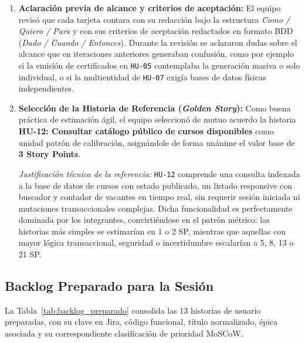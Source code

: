 \begin{enumerate}
    \item \textbf{Aclaración previa de alcance y criterios de aceptación:} El equipo revisó que cada tarjeta contara con su redacción bajo la estructura \textit{Como / Quiero / Para} y con sus criterios de aceptación redactados en formato BDD (\textit{Dado / Cuando / Entonces}). Durante la revisión se aclararon dudas sobre el alcance que en iteraciones anteriores generaban confusión, como por ejemplo si la emisión de certificados en \texttt{HU-05} contemplaba la generación masiva o solo individual, o si la multientidad de \texttt{HU-07} exigía bases de datos físicas independientes.
    
    \item \textbf{Selección de la Historia de Referencia (\textit{Golden Story}):} Como buena práctica de estimación ágil, el equipo seleccionó de mutuo acuerdo la historia \textbf{HU-12: Consultar catálogo público de cursos disponibles} como unidad patrón de calibración, asignándole de forma unánime el valor base de \textbf{3 Story Points}.
    
    \textit{Justificación técnica de la referencia:} \texttt{HU-12} comprende una consulta indexada a la base de datos de cursos con estado publicado, un listado responsive con buscador y contador de vacantes en tiempo real, sin requerir sesión iniciada ni mutaciones transaccionales complejas. Dicha funcionalidad es perfectamente dominada por los integrantes, convirtiéndose en el patrón métrico: las historias más simples se estimarían en 1 o 2 SP, mientras que aquellas con mayor lógica transaccional, seguridad o incertidumbre escalarían a 5, 8, 13 o 21 SP.
\end{enumerate}

\subsection{Backlog Preparado para la Sesión}

La Tabla~\ref{tab:backlog_preparado} consolida las 13 historias de usuario preparadas, con su clave en Jira, código funcional, título normalizado, épica asociada y su correspondiente clasificación de prioridad MoSCoW.


